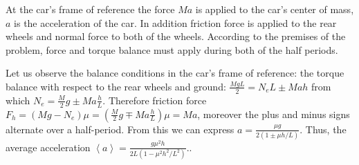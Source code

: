\hinteng
At the car’s frame of reference the force $Ma$ is applied to the car’s center of mass, $a$ is the acceleration of the car. In addition friction force is applied to the rear wheels and normal force to both of the wheels. According to the premises of the problem, force and torque balance must apply during both of the half periods.

\solueng
Let us observe the balance conditions in the car’s frame of reference: the torque balance with respect to the rear wheels and ground: $\frac {MgL}2=N_eL\pm Mah$ from which $N_e=\frac M2g\pm Ma\frac hL$. Therefore friction force $F_h=(Mg-N_e)\mu=(\frac M2g\mp Ma\frac hL)\mu=Ma$, moreover the plus and minus signs alternate over a half-period. From this we can express $a=\frac{\mu g}{2(1\pm \mu h/L)}$. Thus, the average acceleration $\left< a\right>=\frac{g\mu^2h}{2L(1-\mu^2h^2/L^2)}.$.
\probend